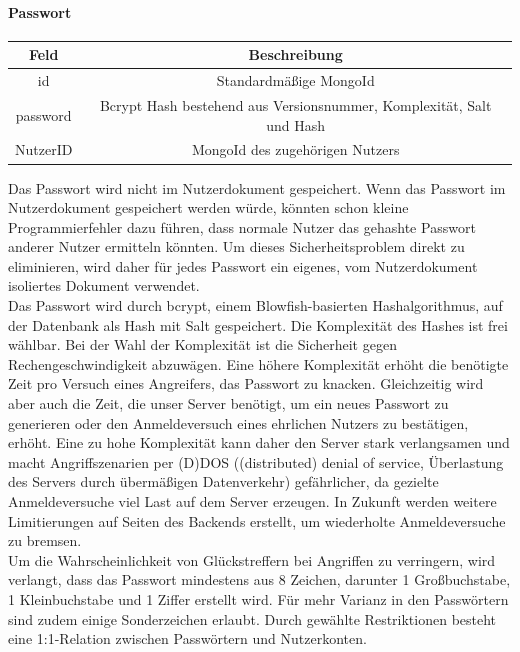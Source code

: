 \paragraph{Passwort\\}
\begin{center}
    \begin{tabular}{ |c|c| }
        \hline
        Feld & Beschreibung  \\
        \hline
        id & Standardmäßige MongoId \\
        password & Bcrypt Hash bestehend aus Versionsnummer, Komplexität, Salt und Hash \\
        NutzerID & MongoId des zugehörigen Nutzers \\
        \hline
    \end{tabular}
\end{center}

Das Passwort wird nicht im Nutzerdokument gespeichert.
Wenn das Passwort im Nutzerdokument gespeichert werden würde, könnten schon kleine Programmierfehler dazu führen, dass normale Nutzer das gehashte Passwort anderer Nutzer ermitteln könnten.
Um dieses Sicherheitsproblem direkt zu eliminieren, wird daher für jedes Passwort ein eigenes, vom Nutzerdokument isoliertes Dokument verwendet.\\
Das Passwort wird durch bcrypt, einem Blowfish-basierten Hashalgorithmus, auf der Datenbank als Hash mit Salt gespeichert.
Die Komplexität des Hashes ist frei wählbar.
Bei der Wahl der Komplexität ist die Sicherheit gegen Rechengeschwindigkeit abzuwägen.
Eine höhere Komplexität erhöht die benötigte Zeit pro Versuch eines Angreifers, das Passwort zu knacken.
Gleichzeitig wird aber auch die Zeit, die unser Server benötigt, um ein neues Passwort zu generieren oder den Anmeldeversuch eines ehrlichen Nutzers zu bestätigen, erhöht.
Eine zu hohe Komplexität kann daher den Server stark verlangsamen und macht Angriffszenarien per (D)DOS ((distributed) denial of service, Überlastung des Servers durch übermäßigen Datenverkehr) gefährlicher, da gezielte Anmeldeversuche viel Last auf dem Server erzeugen.
In Zukunft werden weitere Limitierungen auf Seiten des Backends erstellt, um wiederholte Anmeldeversuche zu bremsen.\\
Um die Wahrscheinlichkeit von Glückstreffern bei Angriffen zu verringern, wird verlangt, dass das Passwort mindestens aus 8 Zeichen, darunter 1 Großbuchstabe, 1 Kleinbuchstabe und 1 Ziffer erstellt wird.
Für mehr Varianz in den Passwörtern sind zudem einige Sonderzeichen erlaubt.
Durch gewählte Restriktionen besteht eine 1:1-Relation zwischen Passwörtern und Nutzerkonten.

